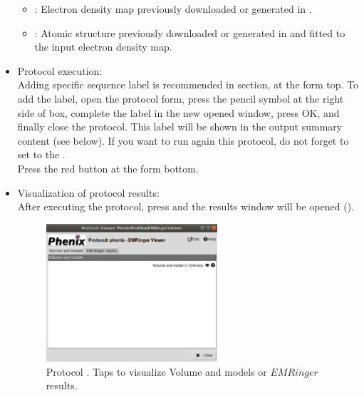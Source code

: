 \begin{itemize}
    \begin{itemize}
     \item {}: Electron density map previously downloaded or generated in \scipion.
     \item {}: Atomic structure previously downloaded or generated in \scipion and fitted to the input electron density map.\
    \end{itemize}
    
 \item Protocol execution:\\

  Adding specific sequence label is recommended in  section, at the form top. To add the label, open the protocol form, press the pencil symbol at the right side of  box, complete the label in the new opened window, press OK, and finally close the protocol. This label will be shown in the output summary content (see below). If you want to run again this protocol, do not forget to set to  the .\\
  Press the \ttt{Execute} red button at the form bottom.\\
  
 \item Visualization of protocol results:\\
  
  After executing the protocol, press  and the results window will be opened ().\\ 
  
  \begin{figure}[H]
     \centering 
     \captionsetup{width=.7\linewidth} 
     \includegraphics[width=0.60\textwidth]{Images_appendix/Fig140.pdf}
     \caption{Protocol \scommand{phenix - emringer}. Taps to visualize Volume and models or $EMRinger$ results.}
     \label{fig:app_protocol_emringer_2}
    \end{figure}
    

\end{itemize}
